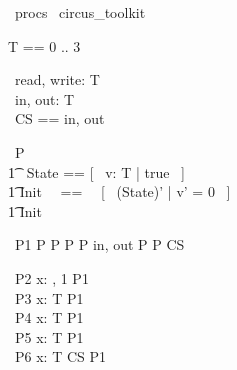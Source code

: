 
\begin{zsection}
  \SECTION\ procs \parents\ circus\_toolkit
\end{zsection}

\begin{zed}
	T == 0 .. 3 \\
\end{zed}

\begin{circus}
	\circchannel\ read, write: T\\
	\circchannel\ in, out: T\\
	\circchannelset\ CS == \lchanset in, out \rchanset \\
\end{circus}

\begin{circus}
    \circprocess\ P \circdef \circbegin \\
        \t1 \circstate\ State == [~ v: T | true ~] \\
        \t1 Init ~~==~~ [~ (State)' | v' = 0 ~] \\
        \t1 \circspot \lschexpract Init \rschexpract \circseq \Skip \\ 
	\circend
\end{circus}

\begin{circus}
    \circprocess\ P1 \circdef P \circseq P \extchoice P \intchoice P \lpar \lchanset in, out \rchanset \rpar P \interleave P \circhide CS
\end{circus}

\begin{circus}
    \circprocess\ P2 \circdef \Semi x: , 1 \rangle \circspot P1  \\
    \circprocess\ P3 \circdef \Extchoice x: T \circspot P1  \\
    \circprocess\ P4 \circdef \Intchoice x: T \circspot P1  \\
    \circprocess\ P5 \circdef \Interleave x: T \circspot P1  \\
    \circprocess\ P6 \circdef \Parallel x: T \lpar CS \rpar \circspot P1  \\
\end{circus}
